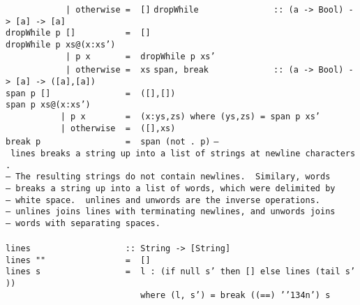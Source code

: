\mbox{\tt \ \ \ \ \ \ \ \ \ \ \ \ |\ otherwise\ =\ \ []}
%
\eprogB\noindent\bprogB
\mbox{\tt dropWhile\ \ \ \ \ \ \ \ \ \ \ \ \ \ \ ::\ (a\ ->\ Bool)\ ->\ [a]\ ->\ [a]}\\
\mbox{\tt dropWhile\ p\ []\ \ \ \ \ \ \ \ \ \ =\ \ []}\\
\mbox{\tt dropWhile\ p\ xs@(x:xs')}\\
\mbox{\tt \ \ \ \ \ \ \ \ \ \ \ \ |\ p\ x\ \ \ \ \ \ \ =\ \ dropWhile\ p\ xs'}\\
\mbox{\tt \ \ \ \ \ \ \ \ \ \ \ \ |\ otherwise\ =\ \ xs}
%
\eprogB\noindent\bprogB
\mbox{\tt span,\ break\ \ \ \ \ \ \ \ \ \ \ \ \ ::\ (a\ ->\ Bool)\ ->\ [a]\ ->\ ([a],[a])}\\
\mbox{\tt span\ p\ []\ \ \ \ \ \ \ \ \ \ \ \ \ \ \ =\ \ ([],[])}\\
\mbox{\tt span\ p\ xs@(x:xs')}\\
\mbox{\tt \ \ \ \ \ \ \ \ \ \ \ |\ p\ x\ \ \ \ \ \ \ \ =\ \ (x:ys,zs)\ where\ (ys,zs)\ =\ span\ p\ xs'}\\
\mbox{\tt \ \ \ \ \ \ \ \ \ \ \ |\ otherwise\ \ =\ \ ([],xs)}\\
\mbox{\tt break\ p\ \ \ \ \ \ \ \ \ \ \ \ \ \ \ \ \ =\ \ span\ (not\ .\ p)}
%
%
\eprogB\noindent\bprogB
\mbox{\tt --\ lines\ breaks\ a\ string\ up\ into\ a\ list\ of\ strings\ at\ newline\ characters.}\\
\mbox{\tt --\ The\ resulting\ strings\ do\ not\ contain\ newlines.\ \ Similary,\ words}\\
\mbox{\tt --\ breaks\ a\ string\ up\ into\ a\ list\ of\ words,\ which\ were\ delimited\ by}\\
\mbox{\tt --\ white\ space.\ \ unlines\ and\ unwords\ are\ the\ inverse\ operations.}\\
\mbox{\tt --\ unlines\ joins\ lines\ with\ terminating\ newlines,\ and\ unwords\ joins}\\
\mbox{\tt --\ words\ with\ separating\ spaces.}\\
\mbox{\tt }\\[-8pt]
\mbox{\tt lines\ \ \ \ \ \ \ \ \ \ \ \ \ \ \ \ \ \ \ ::\ String\ ->\ [String]}\\
\mbox{\tt lines\ ""\ \ \ \ \ \ \ \ \ \ \ \ \ \ \ \ =\ \ []}\\
\mbox{\tt lines\ s\ \ \ \ \ \ \ \ \ \ \ \ \ \ \ \ \ =\ \ l\ :\ (if\ null\ s'\ then\ []\ else\ lines\ (tail\ s'))}\\
\mbox{\tt \ \ \ \ \ \ \ \ \ \ \ \ \ \ \ \ \ \ \ \ \ \ \ \ \ \ \ where\ (l,\ s')\ =\ break\ ((==)\ '{\char'134}n')\ s}
